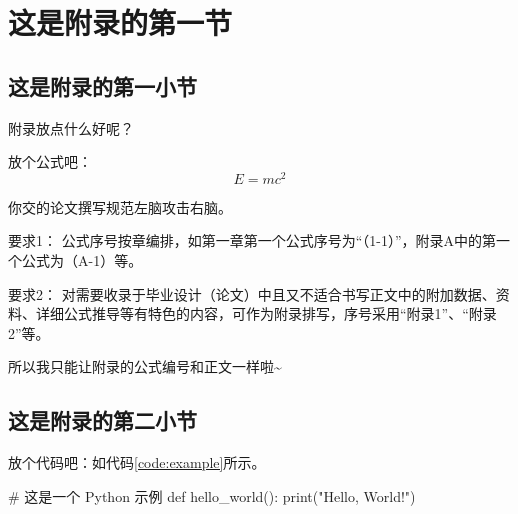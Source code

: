 
\section{这是附录的第一节}

\subsection{这是附录的第一小节}

附录放点什么好呢？

放个公式吧：
\begin{equation}
    E = mc^2
\end{equation}

你交的论文撰写规范左脑攻击右脑。

要求1：
公式序号按章编排，如第一章第一个公式序号为“（1-1）”，附录A中的第一个公式为（A-1）等。

要求2：
对需要收录于毕业设计（论文）中且又不适合书写正文中的附加数据、资料、详细公式推导等有特色的内容，可作为附录排写，序号采用“附录1”、“附录2”等。

所以我只能让附录的公式编号和正文一样啦\~{}

\subsection{这是附录的第二小节}

放个代码吧：如代码\ref{code:example}所示。

\begin{swjtuCodeBlock}[language=Python, caption=示例代码, label=code:example]
# 这是一个 Python 示例
def hello_world():
    print("Hello, World!")
\end{swjtuCodeBlock}